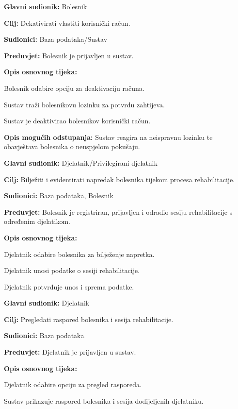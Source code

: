 	\item \textbf{Glavni sudionik:} Bolesnik
	\item \textbf{Cilj:} Dekativirati vlastiti korisnički račun.
	\item \textbf{Sudionici:} Baza podataka/Sustav
	\item \textbf{Preduvjet:} Bolesnik je prijavljen u sustav.
	\item \textbf{Opis osnovnog tijeka:}
	\begin{packed_enum}
		\item Bolesnik odabire opciju za deaktivaciju računa.
		\item Sustav traži bolesnikovu lozinku za potvrdu zahtijeva.
		\item Sustav je deaktivirao bolesnikov korisnički račun.
	\end{packed_enum}
	\item \textbf{Opis mogućih odstupanja:}
	Sustav reagira na neispravnu lozinku te obavještava bolesnika o neuspjelom pokušaju.
\closeusecase

	\item \textbf{Glavni sudionik:} Djelatnik/Privilegirani djelatnik
	\item \textbf{Cilj:} Bilježiti i evidentirati napredak bolesnika tijekom procesa rehabilitacije.
	\item \textbf{Sudionici:} Baza podataka, Bolesnik
	\item \textbf{Preduvjet:} Bolesnik je registriran, prijavljen i odradio sesiju rehabilitacije s određenim djelatikom.
	\item \textbf{Opis osnovnog tijeka:}
	\begin{packed_enum}
		\item Djelatnik odabire bolesnika za bilježenje napretka.
		\item Djelatnik unosi podatke o sesiji rehabilitacije.
		\item Djelatnik potvrđuje unos i sprema podatke.
	\end{packed_enum}
\closeusecase

	\item \textbf{Glavni sudionik:} Djelatnik
	\item \textbf{Cilj:} Pregledati raspored bolesnika i sesija rehabilitacije.
	\item \textbf{Sudionici:} Baza podataka
	\item \textbf{Preduvjet:} Djelatnik je prijavljen u sustav.
	\item \textbf{Opis osnovnog tijeka:}
	\begin{packed_enum}
		\item Djelatnik odabire opciju za pregled rasporeda.
		\item Sustav prikazuje raspored bolesnika i sesija dodijeljenih djelatniku.
	\end{packed_enum}
\closeusecase

